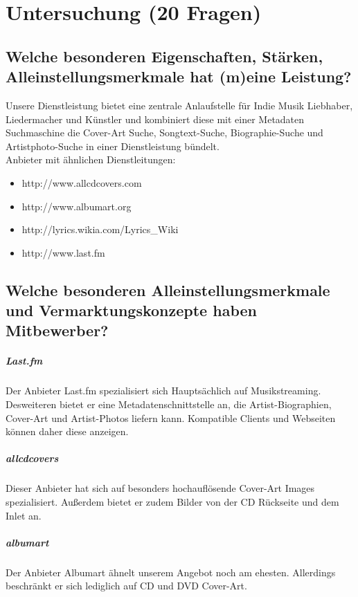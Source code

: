 \chapter{Untersuchung (20 Fragen)}

\label{wettbewerb}
\section{Welche besonderen Eigenschaften, Stärken, Alleinstellungsmerkmale hat (m)eine Leistung?}
Unsere Dienstleistung bietet eine zentrale Anlaufstelle für Indie Musik
Liebhaber, Liedermacher und Künstler und kombiniert diese mit einer Metadaten Suchmaschine
die Cover-Art Suche, Songtext-Suche, Biographie-Suche und Artistphoto-Suche in
einer Dienstleistung bündelt.
\\
Anbieter mit ähnlichen Dienstleitungen: \\

\begin{itemize}
    \item http://www.allcdcovers.com
    \item http://www.albumart.org
    \item http://lyrics.wikia.com/Lyrics\_Wiki
    \item http://www.last.fm
\end{itemize}

\section{Welche besonderen Alleinstellungsmerkmale und Vermarktungskonzepte haben Mitbewerber?}
\paragraph{Last.fm}
Der Anbieter Last.fm spezialisiert sich Hauptsächlich auf Musikstreaming.
Desweiteren bietet er eine Metadatenschnittstelle an, die Artist-Biographien,
Cover-Art und Artist-Photos liefern kann. Kompatible Clients und Webseiten können
daher diese anzeigen.

\paragraph{allcdcovers}
Dieser Anbieter hat sich auf besonders hochauflösende Cover-Art Images
spezialisiert. Außerdem bietet er zudem Bilder von der CD Rückseite und dem
Inlet an.

\paragraph{albumart}
Der Anbieter Albumart ähnelt unserem Angebot noch am ehesten. Allerdings
beschränkt er sich lediglich auf CD und DVD Cover-Art.

